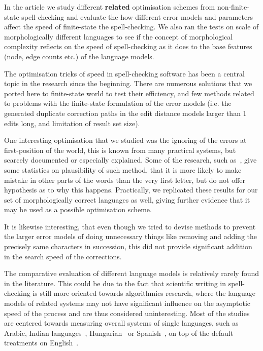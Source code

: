 \documentclass[officiallayout]{unihelcompling}
\begin{document}
In the article we study different \textbf{related} optimisation schemes from
non-finite-state spell-checking and evaluate the how different error models and
parameters affect the speed of finite-state the spell-checking. We also ran the
tests on scale of morphologically different languages to see if the concept of
morphological complexity reflects on the speed of spell-checking as it does to
the base features (node, edge counts etc.) of the language models.

The optimisation tricks of speed in spell-checking software has been a central
topic in the research since the beginning. There are numerous solutions that we
ported here to finite-state world to test their efficiency, and few methods
related to problems with the finite-state formulation of the error models (i.e.
the generated duplicate correction paths in the edit distance models larger
than 1 edits long, and limitation of result set size).

One interesting optimisation that we studied was the ignoring of the errors
at first-position of the world, this is known from many practical systems, but
scarcely documented or especially explained. Some of the research, such
as~\citep{bhagat2007spelling}, give some statistics on plausibility of such 
method, that it is more likely to make mistake in other parts of the words than
the very first letter, but do not offer hypothesis as to why this happens.
Practically, we replicated these results for our set of morphologically correct
languages as well, giving further evidence that it may be used as a possible
optimisation scheme.

It is likewise interesting, that even though we tried to devise methods to
prevent the larger error models of doing unnecessary things like removing and
adding the precisely same characters in succession, this did not provide
significant addition in the search speed of the corrections.

The comparative evaluation of different language models is relatively rarely
found in the literature. This could be due to the fact that scientific writing
in spell-checking is still more oriented towards algorithmics research, where
the language models of related systems may not have significant influence on
the asymptotic speed of the process and are thus considered uninteresting. Most
of the studies are centered towards measuring overall systems of single
languages, such as Arabic, Indian languages~\citep{chaudhuri2002towards},
Hungarian~\citep{tron2005hunmorph} or Spanish~\cite{otero2007contextual}, on top
of the default treatments on English~\citep{mitton1987spelling}.
\end{document}
